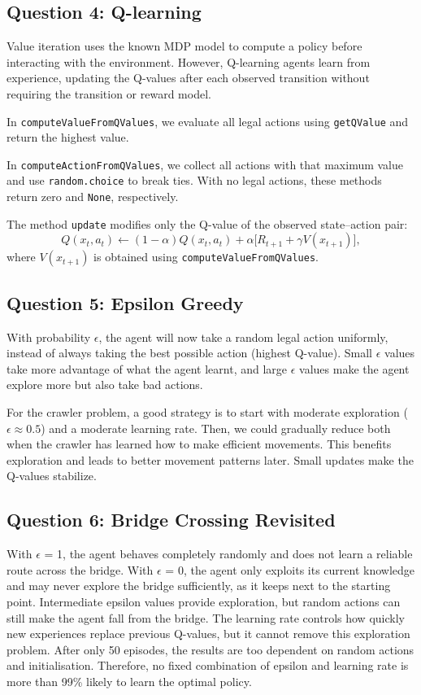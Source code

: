 \documentclass[11pt,a4paper]{article}
\begin{document}
\subsection{Question 4: Q-learning}
Value iteration uses the known MDP model to compute a policy before
interacting with the environment. However, Q-learning agents learn 
from experience, updating the Q-values after each observed transition
without requiring the transition or reward model.

In \texttt{computeValueFromQValues}, we evaluate all legal actions
using \texttt{getQValue} and return the highest value.

In \texttt{computeActionFromQValues}, we collect all actions
with that maximum value and use \texttt{random.choice} to break ties.
With no legal actions, these methods return zero and
\texttt{None}, respectively.

The method \texttt{update} modifies only the Q-value of the
observed state--action pair:
\[
Q(x_t,a_t)\leftarrow
(1-\alpha)Q(x_t,a_t)+
\alpha\bigl[R_{t+1}+\gamma V(x_{t+1})\bigr],
\]
where $V(x_{t+1})$ is obtained using
\texttt{computeValueFromQValues}.

\subsection{Question 5: Epsilon Greedy}
With probability $\epsilon$, the agent will now take a random legal action uniformly, instead of always taking the best possible action (highest Q-value). Small $\epsilon$ values take more advantage of what the agent learnt, and large $\epsilon$ values make the agent explore more but also take bad actions.

For the crawler problem, a good strategy is to start with moderate exploration
($\epsilon\approx0.5$) and a moderate learning rate. Then, we could gradually
reduce both when the crawler has learned how to make efficient movements. This benefits exploration and leads to better movement patterns later. Small updates make the Q-values stabilize.

\subsection{Question 6: Bridge Crossing Revisited}
With $\epsilon$ = 1, the agent behaves completely randomly and does not learn a reliable route across the bridge.
With $\epsilon$ = 0, the agent only exploits its current knowledge and may never explore the bridge sufficiently, as it keeps next to the starting point.
Intermediate epsilon values provide exploration, but random actions can still make the agent fall from the bridge.
The learning rate controls how quickly new experiences replace previous Q-values, but it cannot remove this exploration problem.
After only 50 episodes, the results are too dependent on random actions and initialisation.
Therefore, no fixed combination of epsilon and learning rate is more than 99\% likely to learn the optimal policy.
\end{document}
